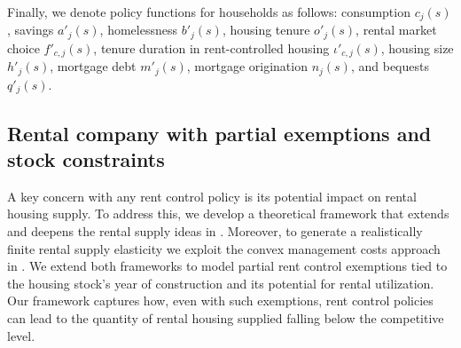 \documentclass[parskip=full]{article}
\begin{document}
Finally, we denote policy functions for households as follows: consumption $c_{j}(s)$, savings $a'_{j}(s)$, homelessness $b'_{j}(s)$, housing tenure $o'_{j}(s)$, rental market choice $f'_{c,j}(s)$, tenure duration in rent-controlled housing $\iota'_{c,j}(s)$, housing size $h'_{j}(s)$, mortgage debt $m'_{j}(s)$, mortgage origination $n_{j}(s)$, and bequests $q'_{j}(s)$.

\subsection{Rental company with partial exemptions and stock constraints}\label{sec:rental_company}

A key concern with any rent control policy is its potential impact on rental housing supply. To address this, we develop a theoretical framework that extends and deepens the rental supply ideas in \citet{fallis-1985}. Moreover, to generate a realistically finite rental supply elasticity we exploit the convex management costs approach in \citet{garrigaeetal-2009}. We extend both frameworks to model partial rent control exemptions tied to the housing stock’s year of construction and its potential for rental utilization. Our framework captures how, even with such exemptions, rent control policies can lead to the quantity of rental housing supplied falling below the competitive level.
\end{document}
